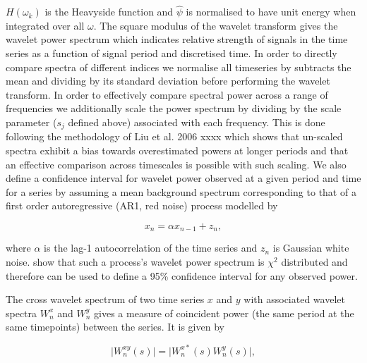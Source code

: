 $H(\omega_k)$ is the Heavyside function and $\hat{\psi}$ is normalised to have unit energy when integrated over all $\omega$. The square modulus of the wavelet transform gives the wavelet power spectrum which indicates relative strength of signals in the time series as a function of signal period and discretised time. In order to directly compare spectra of different indices we normalise all timeseries by subtracts the mean and dividing by its standard deviation before performing the wavelet transform. In order to effectively compare spectral power across a range of frequencies we additionally scale the power spectrum by dividing by the scale parameter ($s_j$ defined above) associated with each frequency. This is done following the methodology of Liu et al. 2006 xxxx which shows that un-scaled spectra exhibit a bias towards overestimated powers at longer periods and that an effective comparison across timescales is possible with such scaling. We also define a confidence interval for wavelet power observed at a given period and time for a series by assuming a mean background spectrum corresponding to that of a first order autoregressive (AR1, red noise) process modelled by

\begin{equation} \label{rednoise}
x_n = \alpha x_{n - 1} + z_n,
\end{equation}

where $\alpha$ is the lag-1 autocorrelation of the time series and $z_n$ is Gaussian white noise. \cite{Torrence1998} show that such a process's wavelet power spectrum is $\chi^2$ distributed and therefore can be used to define a 95\% confidence interval for any observed power. 

The cross wavelet spectrum of two time series $x$ and $y$ with associated wavelet spectra $W^x_n$ and $W^y_n$ gives a measure of coincident power (the same period at the same timepoints) between the series. It is given by

\begin{equation} \label{wavelet_cross}
\vert W^{xy}_n(s)\vert = \vert W^{x*}_n(s) W^{y}_n(s)\vert,
\end{equation}

